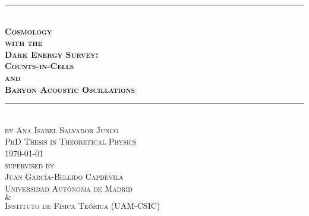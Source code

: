 \documentclass{book}%
\newcommand{\HRule}{\rule{\linewidth}{0.5mm}} %
\begin{document}
\begin{titlepage}
\vspace*{-0.5cm}
\center 
\HRule \\
{\huge \bfseries \textsc{Cosmology\\[0.1cm] with the\\[0.1cm] Dark Energy Survey:\\[0.2cm] Counts-in-Cells\\[0.1cm] and\\[0.1cm] Baryon Acoustic Oscillations\\}}%
\HRule \\[1.5cm]
{\LARGE \scshape{ \textsc{by Ana Isabel Salvador Junco}}}\\[1.5cm]%
{\large \textsc{ PhD Thesis in Theoretical Physics}}\\[0.5cm]
{\large \today}\\[1.5cm] %
{\large \textsc{ supervised by}}\\[0.5cm]%
{\Large  \textsc{Juan Garc\'ia-Bellido Capdevila}}\\[2cm] %
\textsc{\Large \textsc{Universidad Aut\'onoma de Madrid}}\\ [0.3cm]%
\textsc{\Large $\&$}\\[0.3cm]%
\textsc{\Large \textsc{Instituto de F\'isica Te\'orica (UAM-CSIC)}}\\[2cm] 
\end{titlepage}
\end{document}
